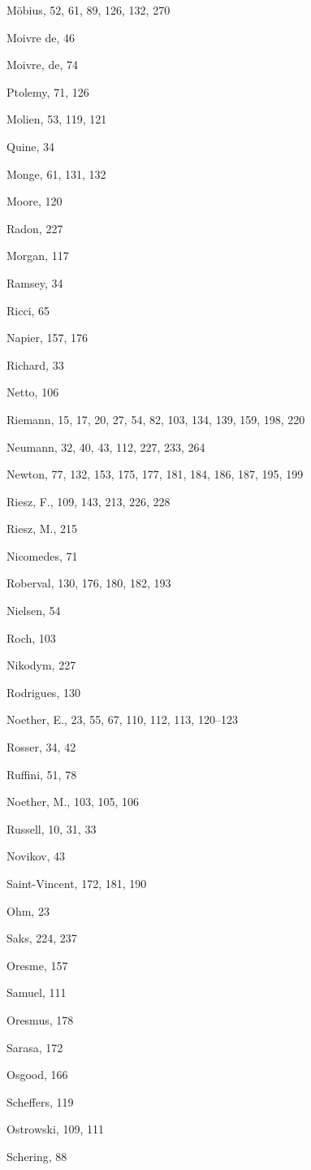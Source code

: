 Möbius, 52, 61, 89, 126, 132, 270

Moivre de, 46

Moivre, de, 74

Ptolemy, 71, 126

Molien, 53, 119, 121

Quine, 34

Monge, 61, 131, 132

Moore, 120

Radon, 227

Morgan, 117

Ramsey, 34

Ricci, 65

Napier, 157, 176

Richard, 33

Netto, 106

Riemann, 15, 17, 20, 27, 54, 82, 103, 134, 139, 159, 198, 220

Neumann, 32, 40, 43, 112, 227, 233, 264

Newton, 77, 132, 153, 175, 177, 181, 184, 186, 187, 195, 199

Riesz, F., 109, 143, 213, 226, 228

Riesz, M., 215

Nicomedes, 71

Roberval, 130, 176, 180, 182, 193

Nielsen, 54

Roch, 103

Nikodym, 227

Rodrigues, 130

Noether, E., 23, 55, 67, 110, 112, 113, 120--123

Rosser, 34, 42

Ruffini, 51, 78

Noether, M., 103, 105, 106

Russell, 10, 31, 33

Novikov, 43

Saint-Vincent, 172, 181, 190

Ohm, 23

Saks, 224, 237

Oresme, 157

Samuel, 111

Oresmus, 178

Sarasa, 172

Osgood, 166

Scheffers, 119

Ostrowski, 109, 111

Schering, 88

